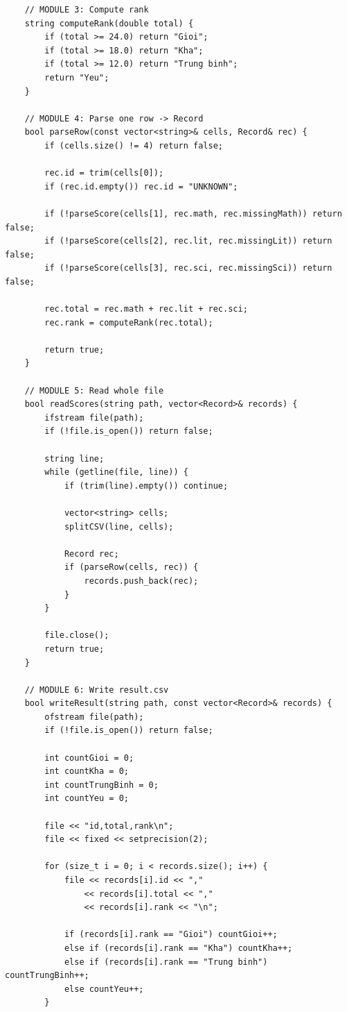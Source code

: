 \begin{lstlisting}
    // MODULE 3: Compute rank
    string computeRank(double total) {
        if (total >= 24.0) return "Gioi";
        if (total >= 18.0) return "Kha";
        if (total >= 12.0) return "Trung binh";
        return "Yeu";
    }

    // MODULE 4: Parse one row -> Record
    bool parseRow(const vector<string>& cells, Record& rec) {
        if (cells.size() != 4) return false;

        rec.id = trim(cells[0]);
        if (rec.id.empty()) rec.id = "UNKNOWN";

        if (!parseScore(cells[1], rec.math, rec.missingMath)) return false;
        if (!parseScore(cells[2], rec.lit, rec.missingLit)) return false;
        if (!parseScore(cells[3], rec.sci, rec.missingSci)) return false;

        rec.total = rec.math + rec.lit + rec.sci;
        rec.rank = computeRank(rec.total);

        return true;
    }

    // MODULE 5: Read whole file
    bool readScores(string path, vector<Record>& records) {
        ifstream file(path);
        if (!file.is_open()) return false;

        string line;
        while (getline(file, line)) {
            if (trim(line).empty()) continue;

            vector<string> cells;
            splitCSV(line, cells);

            Record rec;
            if (parseRow(cells, rec)) {
                records.push_back(rec);
            }
        }

        file.close();
        return true;
    }

    // MODULE 6: Write result.csv
    bool writeResult(string path, const vector<Record>& records) {
        ofstream file(path);
        if (!file.is_open()) return false;

        int countGioi = 0;
        int countKha = 0;
        int countTrungBinh = 0;
        int countYeu = 0;

        file << "id,total,rank\n";
        file << fixed << setprecision(2);

        for (size_t i = 0; i < records.size(); i++) {
            file << records[i].id << ","
                << records[i].total << ","
                << records[i].rank << "\n";

            if (records[i].rank == "Gioi") countGioi++;
            else if (records[i].rank == "Kha") countKha++;
            else if (records[i].rank == "Trung binh") countTrungBinh++;
            else countYeu++;
        }


\end{lstlisting}
